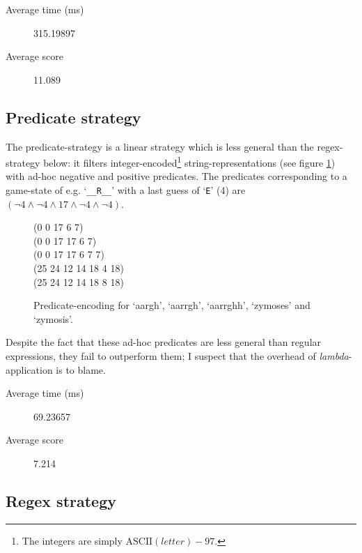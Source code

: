 \documentclass{article}
\begin{document}
\begin{description}
  \item [Average time (ms)] 315.19897
  \item [Average score] 11.089
\end{description}

\subsection{Predicate strategy}

The predicate-strategy is a linear strategy which is less general than
the regex-strategy below: it filters integer-encoded\footnote{The
  integers are simply $\text{ASCII}(letter) - 97$.}
string-representations (see figure \ref{predicate-strings}) with
ad-hoc negative and positive predicates. The predicates corresponding
to a game-state of e.g. `\texttt{\_\_R\_\_}' with a last guess of
`\texttt{E}' (4) are $(\lnot 4 \mathbin{\land} \lnot 4 \mathbin{\land}
17 \mathbin{\land} \lnot 4 \mathbin{\land} \lnot 4)$.

\begin{figure}[h]
  \begin{center}
    \begin{texttt}
      (0 0 17 6 7) \\
      (0 0 17 17 6 7) \\
      (0 0 17 17 6 7 7) \\
      (25 24 12 14 18 4 18) \\
      (25 24 12 14 18 8 18)
    \end{texttt}
  \end{center}
  \caption{Predicate-encoding for `aargh', `aarrgh', `aarrghh',
    `zymoses' and `zymosis'.}
  \label{predicate-strings}
\end{figure}

Despite the fact that these ad-hoc predicates are less general than
regular expressions, they fail to outperform them; I suspect that the
overhead of \emph{lambda}-application is to blame.

\begin{description}
  \item [Average time (ms)] 69.23657
  \item [Average score] 7.214
\end{description}

\subsection{Regex strategy}
\end{document}
